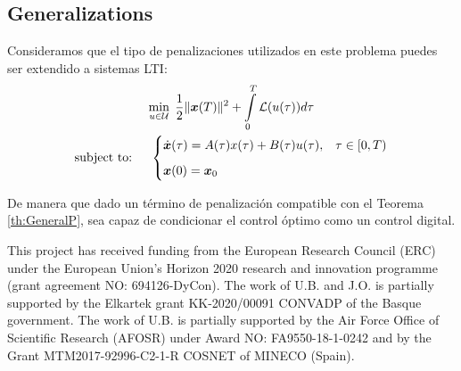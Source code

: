 \documentclass[twocolumn]{autart}    %
\begin{document}
\subsection{Generalizations}


Consideramos que el tipo de penalizaciones utilizados en este problema puedes ser extendido a sistemas LTI:
\begin{gather}
	\min_{u \in \mathcal{U}}\;\frac 12 \|\bm{x}(T)\|^2 + \int_0^T \mathcal{L}(u(\tau))d\tau
	\\
    \notag \text{subject to: }\quad \begin{cases}
            \displaystyle \dot{\bm{x}}(\tau) = A(\tau)x(\tau) +B(\tau)u(\tau),  & \tau \in [0,T)\\[6pt]
            \bm{x}(0) = \bm{x}_0
    \end{cases}
\end{gather}

De manera que dado un término de penalización compatible con el Teorema \ref{th:GeneralP}, sea capaz de condicionar el control óptimo como un control digital.


\begin{ack}            
This project has received funding from the European Research Council (ERC) under the European Union’s Horizon 2020 research and innovation programme (grant agreement NO: 694126-DyCon). The work of U.B. and J.O. is partially supported by the Elkartek grant KK-2020/00091 CONVADP of the Basque government. The work of U.B. is partially supported by the Air Force Office of Scientific Research (AFOSR) under Award NO: FA9550-18-1-0242 and by the Grant MTM2017-92996-C2-1-R COSNET of MINECO (Spain).
\end{ack}
 


 
\end{document}
